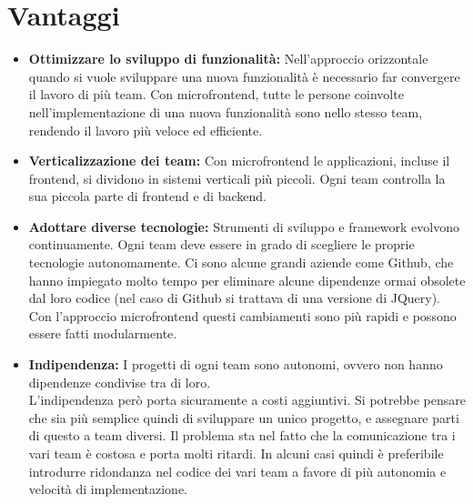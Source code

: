 \section{Vantaggi}
\begin{itemize}
    \item \textbf{Ottimizzare lo sviluppo di funzionalità:}
Nell’approccio orizzontale quando si vuole sviluppare una nuova funzionalità è necessario far convergere il 
lavoro di più team. Con microfrontend,
  tutte le persone coinvolte nell’implementazione di una nuova funzionalità sono nello 
  stesso team, rendendo il lavoro più veloce ed efficiente. 
    \item \textbf{Verticalizzazione dei team:}
Con microfrontend le applicazioni, incluse il frontend, si dividono in sistemi verticali
 più piccoli. Ogni team controlla la sua piccola parte di frontend e di backend.
    \item \textbf{Adottare diverse tecnologie:}
Strumenti di sviluppo e framework evolvono continuamente. Ogni team deve essere in grado di scegliere
le proprie tecnologie autonomamente. Ci sono alcune grandi aziende
 come Github, che hanno
 impiegato molto tempo per eliminare alcune dipendenze ormai obsolete dal loro codice (nel caso di Github si trattava di una versione di JQuery).
  Con l’approccio microfrontend questi cambiamenti sono più rapidi e possono essere
   fatti modularmente.

\item \textbf{Indipendenza:}
I progetti di ogni team sono autonomi, ovvero non hanno dipendenze condivise tra di loro.\\
L’indipendenza però porta sicuramente a costi aggiuntivi. Si potrebbe pensare che sia
 più semplice quindi di sviluppare un unico progetto, e assegnare parti di questo a team diversi. 
 Il problema sta nel fatto che la comunicazione tra i vari team è costosa e porta molti ritardi.
In alcuni casi quindi è preferibile introdurre ridondanza nel codice dei vari team a favore di più autonomia e velocità di
 implementazione.

\end{itemize}

